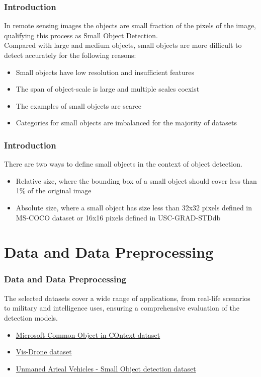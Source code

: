 \documentclass{beamer}
\begin{document}
\begin{frame}[t]
  \frametitle{Introduction}
  In remote sensing images the objects are small fraction of the pixels of the image, qualifying this process as Small Object Detection. \\
  \vspace{0.5cm}
  Compared with large and medium objects, small objects are more difficult to detect accurately for the following reasons:
  \begin{itemize}
    \item Small objects have low resolution and insufficient features
    \item The span of object-scale is large and multiple scales coexist
    \item The examples of small objects are scarce
    \item Categories for small objects are imbalanced for the majority of datasets
  \end{itemize}
\end{frame}


\begin{frame}[t]
  \frametitle{Introduction}
  There are two ways to define small objects in the context of object detection.
  \begin{itemize}
    \item Relative size, where the bounding box of a small object should cover less than 1\% of the original image
    \item Absolute size, where a small object has size less than 32x32 pixels defined in MS-COCO dataset or 16x16 pixels defined in USC-GRAD-STDdb 
  \end{itemize} 

\end{frame}


\section{Data and Data Preprocessing}
\begin{frame}[t]
  \frametitle{Data and Data Preprocessing}
  The selected datasets cover a wide range of applications, from real-life scenarios to military and intelligence uses, ensuring a comprehensive evaluation 
  of the detection models.

  \begin{itemize}
    \item \href{https://cocodataset.org/}{Microsoft Common Object in COntext dataset}
    \item \href{https://github.com/VisDrone/VisDrone-Dataset}{Vis-Drone dataset}
    \item \href{https://www.kaggle.com/datasets/sovitrath/uav-small-object-detection-dataset}{Unmaned Arieal Vehicles - Small Object detection dataset}
  \end{itemize}
\end{frame}
\end{document}
